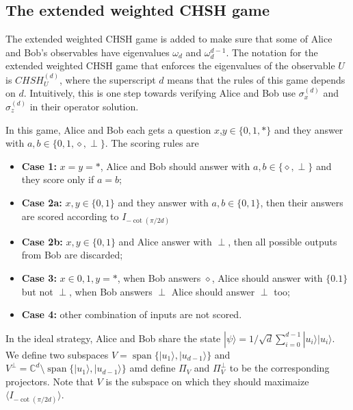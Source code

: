 \documentclass[11pt,letterpaper]{article}
\newcommand{\ket}[1]{|#1\rangle}
\DeclareMathOperator{\spn}{span}
\newcommand{\C}{\mathbb{C}}
\newcommand{\1}{\mathbb{1}}
\newcommand{\CHSH}{CHSH^{(d)}}
\newcommand{\paulix}[1]{\sigma_x^{(#1)}}
\newcommand{\pauliz}[1]{\sigma_z^{(#1)}}
\theoremstyle{definition}
\begin{document}
\subsection{The extended weighted CHSH game}
The extended weighted CHSH game is added to make sure that some of Alice and Bob's observables have
eigenvalues $\omega_d$ and $\omega_d^{d-1}$.
The notation for the extended weighted CHSH game that enforces the eigenvalues of the observable $U$ is 
$\CHSH_U$, where the superscript $d$ means that the rules of this game depends on $d$.
Intuitively, this is one step towards verifying Alice and Bob use $\paulix{d}$ and $\pauliz{d}$ in their operator solution.


In this game, Alice and Bob each gets a question $x$,$y \in \{ 0, 1, \ast\}$ and 
they answer with $a,b \in \{0,1,\diamond,\perp\}$. 
The scoring rules are
\begin{itemize}
	\item \textbf{Case 1:} $x = y = \ast$, Alice and Bob should answer with $a, b \in \{\diamond, \perp\}$ and 
	they score only if $a = b$;
	\item \textbf{Case 2a:} $x,y \in \{0,1\}$ and they answer with $a,b \in \{0,1\}$, then
	their answers are scored according to $I_{-\cot(\pi/2d)}$
	\item \textbf{Case 2b:} $x,y \in \{0,1\}$ and Alice answer with $\perp$, then all possible outputs from Bob
	are discarded;
	\item \textbf{Case 3:} $x \in {0,1}, y = \ast$, when Bob answers $\diamond$, Alice should answer with $\{0.1\}$ but not $\perp$,
	when Bob answers $\perp$ Alice should answer $\perp$ too;
	\item \textbf{Case 4:} other combination of inputs are not scored.
\end{itemize}
In the ideal strategy, Alice and Bob share the state $\ket{\psi} =1/\sqrt{d} \sum_{i=0}^{d-1} \ket{u_i}\ket{u_i}$.
We define two subspaces $V = \spn\{\ket{u_1}, \ket{u_{d-1}}\}$ and $V^\perp = \C^d \setminus\spn\{\ket{u_1}, \ket{u_{d-1}}\}$ amd
define $\Pi_V$ and $\Pi_{V}^\perp$ to be the corresponding projectors. Note that $V$ is the subspace on which they should
 maximaize $\langle I_{-\cot(\pi/2d)} \rangle$.
\end{document}

